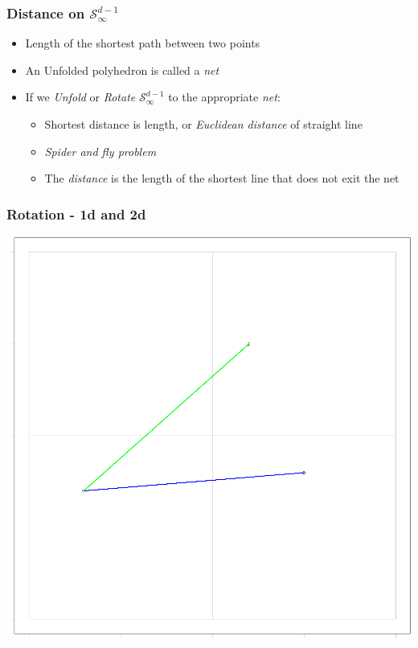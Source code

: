 \documentclass[aspectratio=169]{beamer}
\newlength{\frametextheight}
\begin{document}
\begin{frame}
  \frametitle{Distance on $\mathcal{S}_{\infty}^{d-1}$}
  \begin{itemize}
    \item Length of the shortest path between two points
    \pause
    \item An Unfolded polyhedron is called a \emph{net}
    \pause
    \item If we \emph{Unfold} or \emph{Rotate} $\mathcal{S}_{\infty}^{d-1}$ to the appropriate \emph{net}:
        \begin{itemize}
            \item Shortest distance is length, or \emph{Euclidean distance} of straight line \citep{pappas1989}
            \item \emph{Spider and fly problem}
            \item The \emph{distance} is the length of the shortest line that does not exit the net
        \end{itemize}
  \end{itemize}
\end{frame}

\begin{frame}
    \frametitle{Rotation - 1d and 2d}
    \begin{center}
        \includegraphics[height = \frametextheight]{./images/rot_3d_2d}
    \end{center}
\end{frame}
\end{document}
